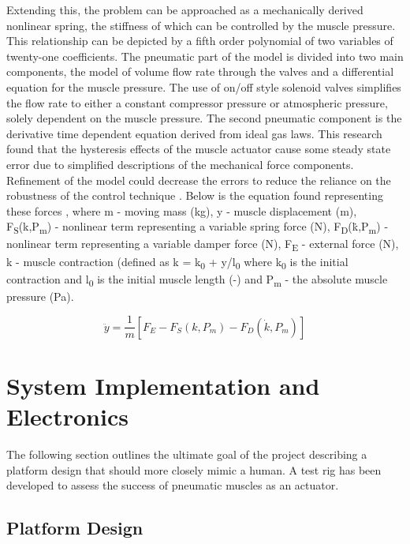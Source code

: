 \documentclass[11pt,a4paper]{article}
\begin{document}
Extending this, the problem can be approached as a mechanically derived nonlinear spring, the stiffness of which can be controlled by the muscle pressure. This relationship can be depicted by a fifth order polynomial of two variables of twenty-one coefficients. The pneumatic part of the model is divided into two main components, the model of volume flow rate through the valves and a differential equation for the muscle pressure. The use of on/off style solenoid valves simplifies the flow rate to either a constant compressor pressure or atmospheric pressure, solely dependent on the muscle pressure. The second pneumatic component is the derivative time dependent equation derived from ideal gas laws. This research found that the hysteresis effects of the muscle actuator cause some steady state error due to simplified descriptions of the mechanical force components. Refinement of the model could decrease the errors to reduce the reliance on the robustness of the control technique \cite{hosovsky_2012}. Below is the equation found representing these forces , where m - moving mass (kg), y - muscle displacement (m), F\textsubscript{S}(k,P\textsubscript{m}) - nonlinear term representing a variable spring force (N), F\textsubscript{D}(\.{k},P\textsubscript{m}) - nonlinear term representing a variable damper force (N), F\textsubscript{E} - external force (N), k - muscle contraction (defined as k = k\textsubscript{0} + y/l\textsubscript{0} where k\textsubscript{0} is the initial contraction and l\textsubscript{0} is the initial muscle length (-) and P\textsubscript{m} - the absolute muscle pressure (Pa).

\begin{equation}
    \ddot{y} = \frac{1}{m}[F_E-F_S(k,P_m)-F_D(\dot{k},P_m)]
    \label{math:dynamicforce}
\end{equation}

\clearpage
\section{System Implementation and Electronics}
\label{sec:system_implementation}

The following section outlines the ultimate goal of the project describing a platform design that should more closely mimic a human. A test rig has been developed to assess the success of pneumatic muscles as an actuator.

\subsection{Platform Design}
\label{sub:platform_design}
\end{document}
